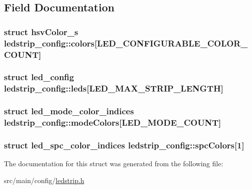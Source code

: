 \subsection{Field Documentation}
\hypertarget{structledstrip__config_a1a7c33abb0d7b2ee9cf1e074cf499169}{
\subsubsection[{colors}]{\setlength{\rightskip}{0pt plus 5cm}struct {\bf hsv\+Color\+\_\+s} ledstrip\+\_\+config\+::colors\mbox{[}{\bf L\+E\+D\+\_\+\+C\+O\+N\+F\+I\+G\+U\+R\+A\+B\+L\+E\+\_\+\+C\+O\+L\+O\+R\+\_\+\+C\+O\+U\+N\+T}\mbox{]}}}\label{structledstrip__config_a1a7c33abb0d7b2ee9cf1e074cf499169}
\hypertarget{structledstrip__config_adbcd2e3a0ba8f4b014f75e967ed5f180}{
\subsubsection[{leds}]{\setlength{\rightskip}{0pt plus 5cm}struct {\bf led\+\_\+config} ledstrip\+\_\+config\+::leds\mbox{[}{\bf L\+E\+D\+\_\+\+M\+A\+X\+\_\+\+S\+T\+R\+I\+P\+\_\+\+L\+E\+N\+G\+T\+H}\mbox{]}}}\label{structledstrip__config_adbcd2e3a0ba8f4b014f75e967ed5f180}
\hypertarget{structledstrip__config_a443dbc325ddf7a7a0bb12342c75f50d5}{
\subsubsection[{mode\+Colors}]{\setlength{\rightskip}{0pt plus 5cm}struct {\bf led\+\_\+mode\+\_\+color\+\_\+indices} ledstrip\+\_\+config\+::mode\+Colors\mbox{[}{\bf L\+E\+D\+\_\+\+M\+O\+D\+E\+\_\+\+C\+O\+U\+N\+T}\mbox{]}}}\label{structledstrip__config_a443dbc325ddf7a7a0bb12342c75f50d5}
\hypertarget{structledstrip__config_a1afd5bff5f9b2ff3f8537e9d7ec91c8c}{
\subsubsection[{spc\+Colors}]{\setlength{\rightskip}{0pt plus 5cm}struct {\bf led\+\_\+spc\+\_\+color\+\_\+indices} ledstrip\+\_\+config\+::spc\+Colors\mbox{[}1\mbox{]}}}\label{structledstrip__config_a1afd5bff5f9b2ff3f8537e9d7ec91c8c}


The documentation for this struct was generated from the following file\+:\begin{DoxyCompactItemize}
\item 
src/main/config/\hyperlink{config_2ledstrip_8h}{ledstrip.\+h}\end{DoxyCompactItemize}
